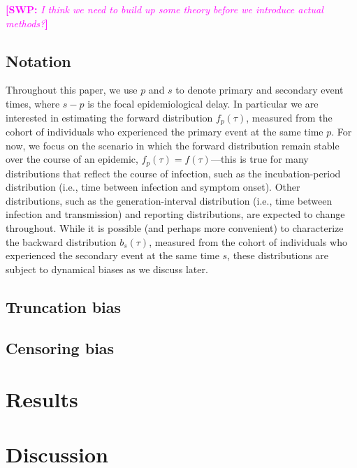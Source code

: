 \documentclass[12pt]{article}
\newcommand{\comment}{\showcomment}
\newcommand{\showcomment}[3]{\textcolor{#1}{\textbf{[#2: }\textsl{#3}\textbf{]}}}
\newcommand{\swp}[1]{\comment{magenta}{SWP}{#1}}
\begin{document}
\swp{I think we need to build up some theory before we introduce actual methods?}

\subsection{Notation}

Throughout this paper, we use $p$ and $s$ to denote primary and secondary event times, where $s-p$ is the focal epidemiological delay.
In particular we are interested in estimating the forward distribution $f_p(\tau)$, measured from the cohort of individuals who experienced the primary event at the same time $p$.
For now, we focus on the scenario in which the forward distribution remain stable over the course of an epidemic, $f_p(\tau) = f(\tau)$---this is true for many distributions that reflect the course of infection, such as the incubation-period distribution (i.e., time between infection and symptom onset).
Other distributions, such as the generation-interval distribution (i.e., time between infection and transmission) and reporting distributions, are expected to change throughout.
While it is possible (and perhaps more convenient) to characterize the backward distribution $b_s(\tau)$, measured from the cohort of individuals who experienced the secondary event at the same time $s$, these distributions are subject to dynamical biases as we discuss later.

\subsection{Truncation bias}




\subsection{Censoring bias}


\section{Results}

\section{Discussion}

\pagebreak


\end{document}

